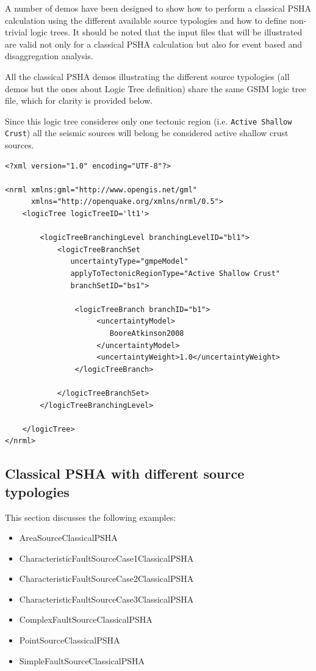 A number of demos have been designed to show how to perform a classical PSHA
calculation using the different available source typologies and how to define
non-trivial logic trees. It should be  noted that the input files that will be
illustrated are valid not only for a classical PSHA calculation but also for
event based and  disaggregation analysis.

All the classical PSHA demos illustrating the different source typologies
(all demos but the ones about Logic Tree definition) share the same GSIM logic
tree file, which for clarity is provided below.

Since this logic tree consideres only one tectonic region (i.e. \texttt{Active
Shallow Crust}) all the seismic sources will belong be considered active
shallow crust sources.

\begin{Verbatim}[frame=single, commandchars=\\\{\}, fontsize=\normalsize]
<?xml version="1.0" encoding="UTF-8"?>

<nrml xmlns:gml="http://www.opengis.net/gml"
      xmlns="http://openquake.org/xmlns/nrml/0.5">
    <logicTree logicTreeID='lt1'>

        <logicTreeBranchingLevel branchingLevelID="bl1">
            <logicTreeBranchSet
               uncertaintyType="gmpeModel"
               applyToTectonicRegionType="Active Shallow Crust"
               branchSetID="bs1">

                <logicTreeBranch branchID="b1">
                     <uncertaintyModel>
                        BooreAtkinson2008
                     </uncertaintyModel>
                     <uncertaintyWeight>1.0</uncertaintyWeight>
                </logicTreeBranch>

            </logicTreeBranchSet>
        </logicTreeBranchingLevel>

    </logicTree>
</nrml>
\end{Verbatim}

\subsection{Classical PSHA with different source typologies}

This section discusses the following examples:

\begin{itemize}
    \item AreaSourceClassicalPSHA
    \item CharacteristicFaultSourceCase1ClassicalPSHA
    \item CharacteristicFaultSourceCase2ClassicalPSHA
    \item CharacteristicFaultSourceCase3ClassicalPSHA
    \item ComplexFaultSourceClassicalPSHA
    \item PointSourceClassicalPSHA
    \item SimpleFaultSourceClassicalPSHA
\end{itemize}

